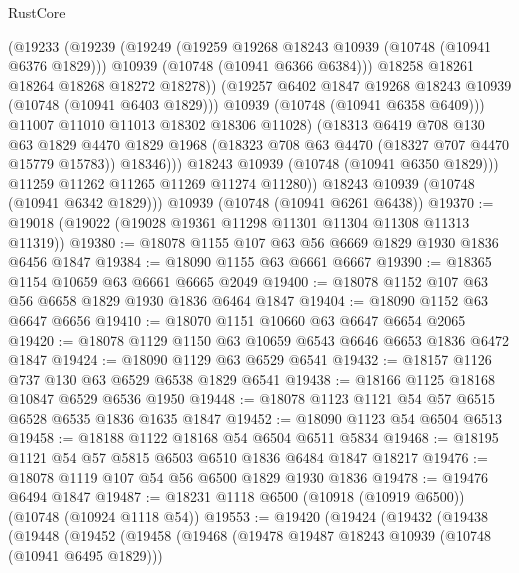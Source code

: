 \begin{lexlean}{RustCore}
\begin{coremodule}
                    (@19233
                      (@19239
                        (@19249
                          (@19259 @19268 @18243 @10939 (@10748 (@10941 @6376 @1829)))
                          @10939
                          (@10748 (@10941 @6366 @6384)))
                        @18258
                        @18261
                        @18264
                        @18268
                        @18272
                        @18278))
                    (@19257 @6402 @1847 @19268 @18243 @10939 (@10748 (@10941 @6403 @1829)))
                    @10939
                    (@10748 (@10941 @6358 @6409)))
                  @11007
                  @11010
                  @11013
                  @18302
                  @18306
                  @11028)
                (@18313
                  @6419
                  @708
                  @130
                  @63
                  @1829
                  @4470
                  @1829
                  @1968
                  (@18323 @708 @63 @4470 (@18327 @707 @4470 @15779 @15783))
                  @18346)))
            @18243
            @10939
            (@10748 (@10941 @6350 @1829)))
          @11259
          @11262
          @11265
          @11269
          @11274
          @11280))
      @18243
      @10939
      (@10748 (@10941 @6342 @1829)))
    @10939
    (@10748 (@10941 @6261 @6438))
@19370 := @19018 (@19022 (@19028 @19361 @11298 @11301 @11304 @11308 @11313 @11319))
@19380 := @18078 @1155 @107 @63 @56 @6669 @1829 @1930 @1836 @6456 @1847
@19384 := @18090 @1155 @63 @6661 @6667
@19390 := @18365 @1154 @10659 @63 @6661 @6665 @2049
@19400 := @18078 @1152 @107 @63 @56 @6658 @1829 @1930 @1836 @6464 @1847
@19404 := @18090 @1152 @63 @6647 @6656
@19410 := @18070 @1151 @10660 @63 @6647 @6654 @2065
@19420 := @18078 @1129 @1150 @63 @10659 @6543 @6646 @6653 @1836 @6472 @1847
@19424 := @18090 @1129 @63 @6529 @6541
@19432 := @18157 @1126 @737 @130 @63 @6529 @6538 @1829 @6541
@19438 := @18166 @1125 @18168 @10847 @6529 @6536 @1950
@19448 := @18078 @1123 @1121 @54 @57 @6515 @6528 @6535 @1836 @1635 @1847
@19452 := @18090 @1123 @54 @6504 @6513
@19458 := @18188 @1122 @18168 @54 @6504 @6511 @5834
@19468 := @18195 @1121 @54 @57 @5815 @6503 @6510 @1836 @6484 @1847 @18217
@19476 := @18078 @1119 @107 @54 @56 @6500 @1829 @1930 @1836
@19478 := @19476 @6494 @1847
@19487 := @18231 @1118 @6500 (@10918 (@10919 @6500)) (@10748 (@10924 @1118 @54))
@19553 := @19420
    (@19424
      (@19432
        (@19438
          (@19448
            (@19452
              (@19458
                (@19468
                  (@19478 @19487 @18243 @10939 (@10748 (@10941 @6495 @1829)))

\end{coremodule}
\end{lexlean}
